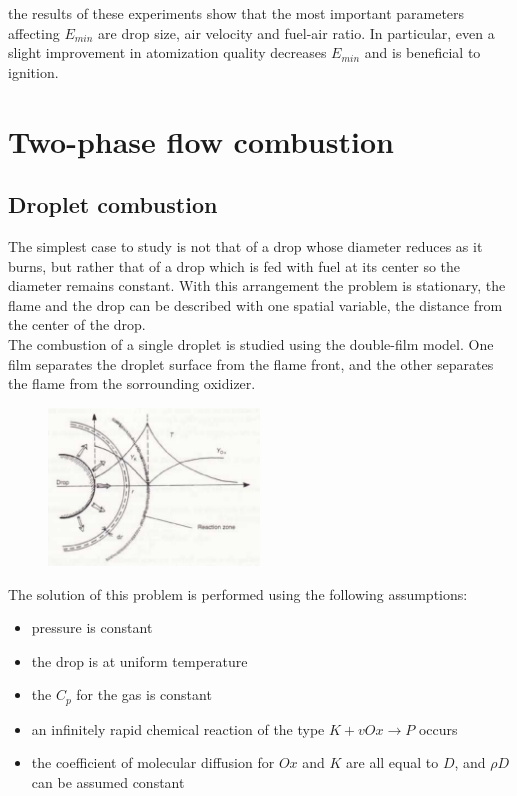 \documentclass[12pt]{article}
\begin{document}
the results of these experiments show that the most important parameters affecting $E_{min}$ are drop size, air velocity and fuel-air ratio. In particular, even a slight improvement in atomization quality decreases $E_{min}$ and is beneficial to ignition.

\newpage

\section{Two-phase flow combustion}

\subsection{Droplet combustion}

The simplest case to study is not that of a drop whose diameter reduces as it burns, but rather that of a drop which is fed with fuel at its center so the diameter remains constant. With this arrangement the problem is stationary, the flame and the drop can be described with one spatial variable, the distance from the center of the drop.\\
The combustion of a single droplet is studied using the double-film model. One film separates the droplet surface from the flame front, and the other separates the flame from the sorrounding oxidizer.

\begin{figure}[!ht]
\centering
\includegraphics[width=0.5\textwidth]{figures/droplet.png}
\end{figure}

The solution of this problem is performed using the following assumptions:

\begin{itemize}
    \item pressure is constant
    \item the drop is at uniform temperature
    \item the $C_{p}$ for the gas is constant
    \item an infinitely rapid chemical reaction of the type $K+vOx \rightarrow P$ occurs
    \item the coefficient of molecular diffusion for $Ox$ and $K$ are all equal to $D$, and $\rho D$ can be assumed constant
\end{itemize}
\end{document}
